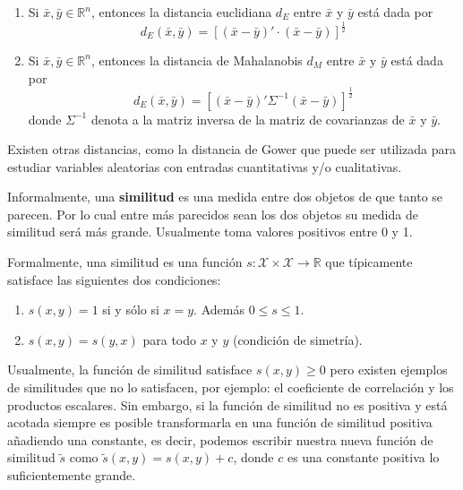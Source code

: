 \documentclass[
]{book}
\begin{document}
\begin{enumerate}
\def\labelenumi{\arabic{enumi})}
\item
  Si \(\bar{x},\bar{y}\in\mathbb{R}^n\), entonces la distancia euclidiana \(d_E\) entre \(\bar{x}\) y \(\bar{y}\) está dada por
  \[
         d_E\left( \bar{x}, \bar{y} \right) = \left[ \left(\bar{x} - \bar{y}\right)'\cdot \left( \bar{x}- \bar{y} \right) \right]^{\frac{1}{2}}
     \]
\item
  Si \(\bar{x},\bar{y}\in\mathbb{R}^n\), entonces la distancia de Mahalanobis \(d_M\) entre \(\bar{x}\) y \(\bar{y}\) está dada por
  \[
         d_E\left( \bar{x}, \bar{y} \right) = \left[ \left(\bar{x} - \bar{y}\right)' \Sigma^{-1} \left( \bar{x}- \bar{y} \right) \right]^{\frac{1}{2}}
     \]
  donde \(\Sigma^{-1}\) denota a la matriz inversa de la matriz de covarianzas de \(\bar{x}\) y \(\bar{y}\).
\end{enumerate}

Existen otras distancias, como la distancia de Gower que puede ser utilizada para estudiar variables aleatorias con entradas cuantitativas y/o cualitativas.

Informalmente, una \textbf{similitud} es una medida entre dos objetos de que tanto se parecen. Por lo cual entre más parecidos sean los dos objetos su medida de similitud será más grande. Usualmente toma valores positivos entre 0 y 1.

Formalmente, una similitud es una función \(s: \mathcal{X}\times \mathcal{X} \to \mathbb{R}\) que típicamente satisface las siguientes dos condiciones:

\begin{enumerate}
\def\labelenumi{\arabic{enumi})}
\item
  \(s(x,y)=1\) si y sólo si \(x=y\). Además \(0\leq s\leq 1\).
\item
  \(s(x,y)=s(y,x)\) para todo \(x\) y \(y\) (condición de simetría).
\end{enumerate}

Usualmente, la función de similitud satisface \(s(x,y)\geq 0\) pero existen ejemplos de similitudes que no lo satisfacen, por ejemplo: el coeficiente de correlación y los productos escalares. Sin embargo, si la función de similitud no es positiva y está acotada siempre es posible transformarla en una función de similitud positiva añadiendo una constante, es decir, podemos escribir nuestra nueva función de similitud \(\tilde{s}\) como \(\tilde{s}(x,y)=s(x,y)+c\), donde \(c\) es una constante positiva lo suficientemente grande.
\end{document}
